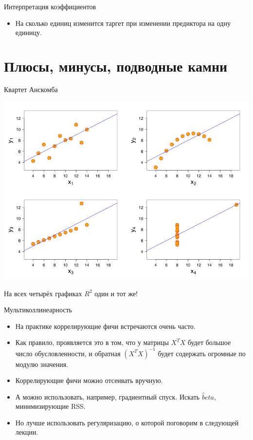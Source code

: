 \documentclass[9pt]{beamer}
\begin{document}
\begin{frame}{Интерпретация коэффициентов}
\begin{itemize}
    \item На сколько единиц изменится таргет при изменении предиктора на одну единицу.
\end{itemize}
\end{frame}

\section{Плюсы, минусы, подводные камни}
\begin{frame}{Квартет Анскомба}
    \begin{center}
        \includegraphics[height=0.7\textheight]{img/linear_regression_anscombes_quartet.png}        
    \end{center}
    На всех четырёх графиках $R^2$ один и тот же!
\end{frame}

\begin{frame}{Мультиколлинеарность}
    \begin{itemize}
        \item На практике коррелирующие фичи встречаются очень часто.
        \item Как правило, проявляется это в том, что у матрицы $X^TX$ будет большое число обусловленности, и обратная $(X^TX)^{-1}$ будет содержать огромные по модулю значения.
        \item Коррелирующие фичи можно отсеивать вручную.
        \item А можно использовать, например, градиентный спуск. Искать $\hat beta$, минимизирующие RSS.
        \item Но лучше использовать регуляризацию, о которой поговорим в следующей лекции.
    \end{itemize}
\end{frame}
\end{document}
